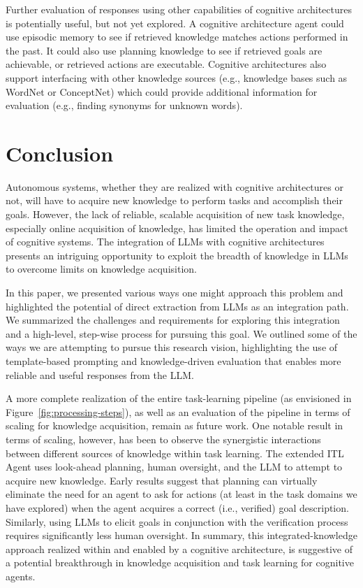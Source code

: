 \documentclass[letterpaper]{article} %
\begin{document}
\vspace{-1.71mm}
Further evaluation of responses using other capabilities of cognitive architectures is potentially useful, but not yet explored. A cognitive architecture agent could use episodic memory to see if retrieved knowledge matches actions performed in the past. It could also use planning knowledge to see if retrieved goals are achievable, or retrieved actions are executable. Cognitive architectures also support interfacing with other knowledge sources (e.g., knowledge bases such as WordNet or ConceptNet) which could provide additional information for evaluation (e.g., finding synonyms for unknown words).


\vspace{-2.65mm}
\section{Conclusion}

Autonomous systems, whether they are realized with cognitive architectures or not, will have to acquire new knowledge to perform tasks and accomplish their goals.
However, the lack of reliable, scalable acquisition of new task knowledge, especially online acquisition of knowledge, has limited the operation and impact of cognitive systems. The integration of LLMs with cognitive architectures presents an intriguing opportunity to exploit the breadth of knowledge in LLMs to overcome limits on knowledge acquisition.

In this paper, we presented various ways one might approach this problem and highlighted the potential of direct extraction from LLMs as an integration path. We summarized the challenges and requirements for exploring this integration and a high-level, step-wise process for pursuing this goal. We outlined some of the ways we are attempting to pursue this research vision, highlighting the use of template-based prompting and knowledge-driven evaluation that enables more reliable and useful responses from the LLM.

A more complete realization of the entire task-learning pipeline (as envisioned in Figure~\ref{fig:processing-steps}), as well as an evaluation of the pipeline in terms of scaling for knowledge acquisition, remain as future work. One notable result in terms of scaling, however, has been to observe the synergistic interactions between different sources of knowledge within task learning. The extended ITL Agent uses look-ahead planning, human oversight, and the LLM to attempt to acquire new knowledge. Early results \cite{kirk_integrating_2023} suggest that planning can virtually eliminate the need for an agent to ask for actions (at least in the task domains we have explored) when the agent acquires a correct (i.e., verified) goal description. Similarly, using LLMs to elicit goals in conjunction with the verification process requires significantly less human oversight. In summary, this integrated-knowledge approach realized within and enabled by a cognitive architecture, is suggestive of a potential breakthrough in knowledge acquisition and task learning for cognitive agents.
\end{document}
